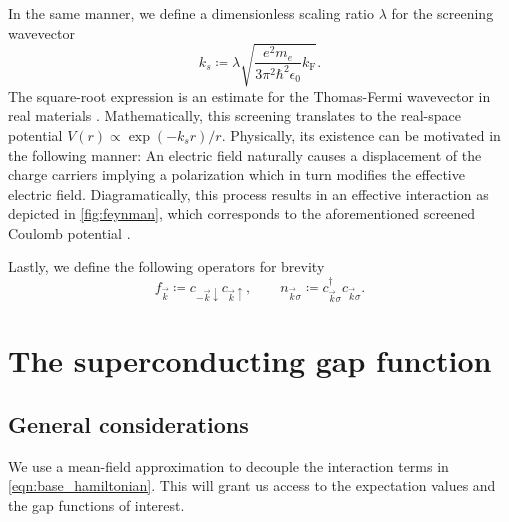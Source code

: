 \documentclass[
    reprint, 
    aps,
    preprintnumbers,
    twocolumn,
    prb,
    superscriptaddress
]{revtex4-2}
\newcommand{\up}{\uparrow}
\newcommand{\down}{\downarrow}
\newcommand{\kf}{k_{\mathrm{F}}}
\newcommand{\ope}[2]{c_{\vec{#1} #2}}
\newcommand{\opd}[2]{\ope{#1}{#2}^\dagger}
\newcommand{\opSC}[1]{c_{-\vec{#1} \down} c_{\vec{#1} \up}}
\begin{document}
In the same manner, we define a dimensionless scaling ratio $\lambda$ for the screening wavevector
\begin{equation}
  k_s \coloneqq \lambda \sqrt{\frac{e^2 m_e}{3 \pi^2 \hbar^2 \epsilon_0} \kf}.
\end{equation}
The square-root expression is an estimate for the Thomas-Fermi wavevector in real materials \cite{rickayzen1980}.
Mathematically, this screening translates to the real-space potential $V(r) \propto \exp (- k_s r) / r$.
Physically, its existence can be motivated in the following manner:
An electric field naturally causes a displacement of the charge carriers implying a polarization which in turn modifies the effective electric field.
Diagramatically, this process results in an effective interaction as depicted in \autoref{fig:feynman},
which corresponds to the aforementioned screened Coulomb potential \cite{rickayzen1980}.

Lastly, we define the following operators for brevity
\begin{equation}
  f_{\vec{k}} \coloneqq \opSC{k},\qquad n_{\vec{k}\sigma} \coloneqq \opd{k}{\sigma} \ope{k}{\sigma}.
\end{equation}


\section{The superconducting gap function}
\label{sec:mean_field}

\subsection{General considerations}

We use a mean-field approximation to decouple the interaction terms in \eqref{eqn:base_hamiltonian}.
This will grant us access to the expectation values and the gap functions of interest.
\end{document}
